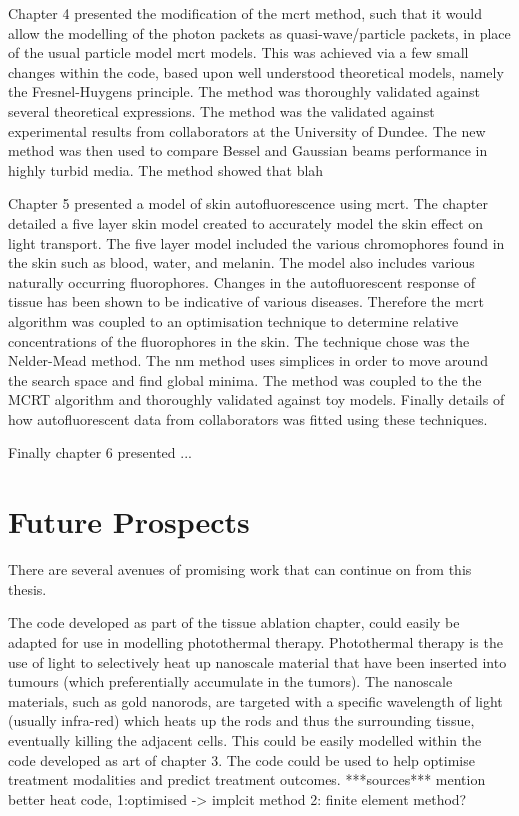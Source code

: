 \medskip

Chapter 4 presented the modification of the \gls*{mcrt} method, such that it would allow the modelling of the photon packets as quasi-wave/particle packets, in place of the usual particle model \gls*{mcrt} models.
This was achieved via a few small changes within the code, based upon well understood theoretical models, namely the Fresnel-Huygens principle.
The method was thoroughly validated against several theoretical expressions.
The method was the validated against experimental results from collaborators at the University of Dundee.
The new method was then used to compare Bessel and Gaussian beams performance in highly turbid media.
The method showed that blah

\medskip

Chapter 5 presented a model of skin autofluorescence using \gls*{mcrt}.
The chapter detailed a five layer skin model created to accurately model the skin effect on light transport.
The five layer model included the various chromophores found in the skin such as blood, water, and melanin.
The model also includes various naturally occurring fluorophores.
Changes in the autofluorescent response of tissue has been shown to be indicative of various diseases.
Therefore the \gls*{mcrt} algorithm was coupled to an optimisation technique to determine relative concentrations of the fluorophores in the skin.
The technique chose was the Nelder-Mead method.
The \gls*{nm} method uses simplices in order to move around the search space and find global minima.
The method was coupled to the the MCRT algorithm and thoroughly validated against toy models.
Finally details of how autofluorescent data from collaborators was fitted using these techniques.

\medskip

Finally chapter 6 presented ...

\section{Future Prospects}

There are several avenues of promising work that can continue on from this thesis.

The code developed as part of the tissue ablation chapter, could easily be adapted for use in modelling photothermal therapy.
Photothermal therapy is the use of light to selectively heat up nanoscale material that have been inserted into tumours (which preferentially accumulate in the tumors).
The nanoscale materials, such as gold nanorods, are targeted with a specific wavelength of light (usually infra-red) which heats up the rods and thus the surrounding tissue, eventually killing the adjacent cells.
This could be easily modelled within the code developed as art of chapter 3.
The code could be used to help optimise treatment modalities and predict treatment outcomes. ***sources***
mention better heat code, 1:optimised -> implcit method 2: finite element method?



